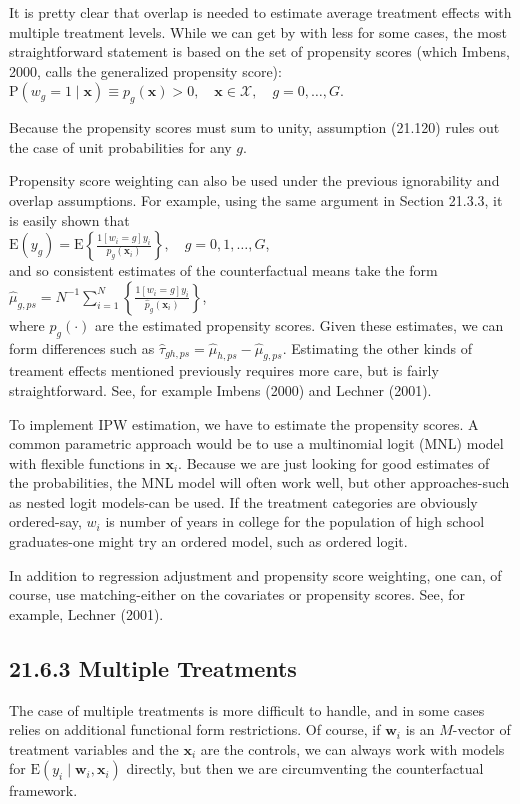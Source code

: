 \documentclass[10pt]{article}
\begin{document}
It is pretty clear that overlap is needed to estimate average treatment effects with multiple treatment levels. While we can get by with less for some cases, the most straightforward statement is based on the set of propensity scores (which Imbens, 2000, calls the generalized propensity score):\\
$\mathrm{P}\left(w_{g}=1 \mid \mathbf{x}\right) \equiv p_{g}(\mathbf{x})>0, \quad \mathbf{x} \in \mathscr{X}, \quad g=0, \ldots, G$.

Because the propensity scores must sum to unity, assumption (21.120) rules out the case of unit probabilities for any $g$.

Propensity score weighting can also be used under the previous ignorability and overlap assumptions. For example, using the same argument in Section 21.3.3, it is easily shown that\\
$\mathrm{E}\left(y_{g}\right)=\mathrm{E}\left\{\frac{1\left[w_{i}=g\right] y_{i}}{p_{g}\left(\mathbf{x}_{i}\right)}\right\}, \quad g=0,1, \ldots, G$,\\
and so consistent estimates of the counterfactual means take the form\\
$\hat{\mu}_{g, p s}=N^{-1} \sum_{i=1}^{N}\left\{\frac{1\left[w_{i}=g\right] y_{i}}{\hat{p}_{g}\left(\mathbf{x}_{i}\right)}\right\}$,\\
where $\hat{p}_{g}(\cdot)$ are the estimated propensity scores. Given these estimates, we can form differences such as $\hat{\tau}_{g h, p s}=\hat{\mu}_{h, p s}-\hat{\mu}_{g, p s}$. Estimating the other kinds of treament effects mentioned previously requires more care, but is fairly straightforward. See, for example Imbens (2000) and Lechner (2001).

To implement IPW estimation, we have to estimate the propensity scores. A common parametric approach would be to use a multinomial logit (MNL) model with flexible functions in $\mathbf{x}_{i}$. Because we are just looking for good estimates of the probabilities, the MNL model will often work well, but other approaches-such as nested logit models-can be used. If the treatment categories are obviously ordered-say, $w_{i}$ is number of years in college for the population of high school graduates-one might try an ordered model, such as ordered logit.

In addition to regression adjustment and propensity score weighting, one can, of course, use matching-either on the covariates or propensity scores. See, for example, Lechner (2001).

\subsection*{21.6.3 Multiple Treatments}
The case of multiple treatments is more difficult to handle, and in some cases relies on additional functional form restrictions. Of course, if $\mathbf{w}_{i}$ is an $M$-vector of treatment variables and the $\mathbf{x}_{i}$ are the controls, we can always work with models for $\mathrm{E}\left(y_{i} \mid \mathbf{w}_{i}, \mathbf{x}_{i}\right)$ directly, but then we are circumventing the counterfactual framework.
\end{document}
